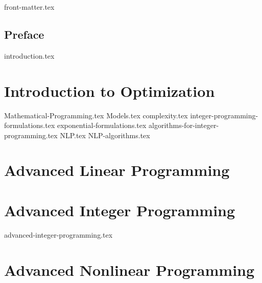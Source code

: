 \documentclass[letter,11pt]{book}
\begin{document}
 
  
{front-matter.tex}



\chapter*{Preface}



{introduction.tex}
\tableofcontents

\part{Introduction to Optimization}
{Mathematical-Programming.tex}
{Models.tex}
{complexity.tex}
{integer-programming-formulations.tex}
{exponential-formulations.tex}
{algorithms-for-integer-programming.tex}
{NLP.tex}
{NLP-algorithms.tex}
\part{Advanced Linear Programming}
\part{Advanced Integer Programming}
{advanced-integer-programming.tex}
\part{Advanced Nonlinear Programming}
\ifx\footfullcite\undefined  %
  
  
\else                        %
  \printbibliography
\fi
\end{document}
